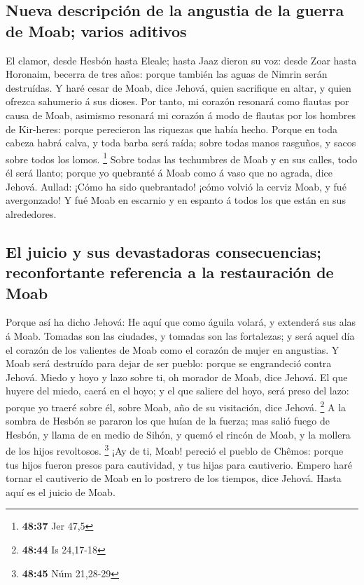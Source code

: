 \hypertarget{nueva-descripciuxf3n-de-la-angustia-de-la-guerra-de-moab-varios-aditivos}{%
\subsection{Nueva descripción de la angustia de la guerra de Moab;
varios
aditivos}\label{nueva-descripciuxf3n-de-la-angustia-de-la-guerra-de-moab-varios-aditivos}}

 El clamor, desde Hesbón hasta Eleale; hasta Jaaz dieron su
voz: desde Zoar hasta Horonaim, becerra de tres años: porque también las
aguas de Nimrin serán destruídas.  Y haré cesar de Moab,
dice Jehová, quien sacrifique en altar, y quien ofrezca sahumerio á sus
dioses.  Por tanto, mi corazón resonará como flautas por
causa de Moab, asimismo resonará mi corazón á modo de flautas por los
hombres de Kir-heres: porque perecieron las riquezas que había hecho.
 Porque en toda cabeza habrá calva, y toda barba será
raída; sobre todas manos rasguños, y sacos sobre todos los lomos.
\footnote{\textbf{48:37} Jer 47,5}  Sobre todas las
techumbres de Moab y en sus calles, todo él será llanto; porque yo
quebranté á Moab como á vaso que no agrada, dice Jehová. 
Aullad: ¡Cómo ha sido quebrantado! ¡cómo volvió la cerviz Moab, y fué
avergonzado! Y fué Moab en escarnio y en espanto á todos los que están
en sus alrededores.

\hypertarget{el-juicio-y-sus-devastadoras-consecuencias-reconfortante-referencia-a-la-restauraciuxf3n-de-moab}{%
\subsection{El juicio y sus devastadoras consecuencias; reconfortante
referencia a la restauración de
Moab}\label{el-juicio-y-sus-devastadoras-consecuencias-reconfortante-referencia-a-la-restauraciuxf3n-de-moab}}

 Porque así ha dicho Jehová: He aquí que como águila
volará, y extenderá sus alas á Moab.  Tomadas son las
ciudades, y tomadas son las fortalezas; y será aquel día el corazón de
los valientes de Moab como el corazón de mujer en angustias.
 Y Moab será destruído para dejar de ser pueblo: porque se
engrandeció contra Jehová.  Miedo y hoyo y lazo sobre ti,
oh morador de Moab, dice Jehová.  El que huyere del miedo,
caerá en el hoyo; y el que saliere del hoyo, será preso del lazo: porque
yo traeré sobre él, sobre Moab, año de su visitación, dice Jehová.
\footnote{\textbf{48:44} Is 24,17-18}  A la sombra de
Hesbón se pararon los que huían de la fuerza; mas salió fuego de Hesbón,
y llama de en medio de Sihón, y quemó el rincón de Moab, y la mollera de
los hijos revoltosos. \footnote{\textbf{48:45} Núm 21,28-29}
 ¡Ay de ti, Moab! pereció el pueblo de Chêmos: porque tus
hijos fueron presos para cautividad, y tus hijas para cautiverio.
 Empero haré tornar el cautiverio de Moab en lo postrero de
los tiempos, dice Jehová. Hasta aquí es el juicio de Moab.

